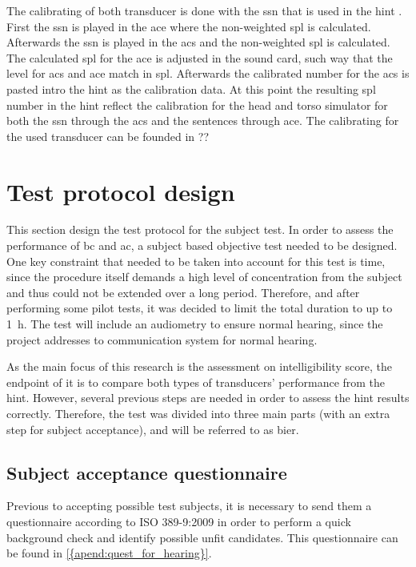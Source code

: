 The calibrating of both transducer is done with the \gls{ssn} that is used in the \gls{hint} \citep{nilsson_95}. First the \gls{ssn} is played in the \gls{ace} where the non-weighted \gls{spl} is calculated. Afterwards the \gls{ssn} is played in the \gls{acs} and the non-weighted \gls{spl} is calculated. The calculated \gls{spl} for the \gls{ace} is adjusted in the sound card, such way that the level for \gls{acs} and \gls{ace} match in \gls{spl}. Afterwards the calibrated number for the \gls{acs} is pasted intro the \gls{hint} as the calibration data. At this point the resulting \gls{spl} number in the \gls{hint} reflect the calibration for the head and torso simulator for both the \gls{ssn} through the \gls{acs} and the sentences through \gls{ace}. The calibrating for the used transducer can be founded in ?? %
   
   
   
\section{Test protocol design}   
This section design the test protocol for the subject test. In order to assess the performance of \gls{bc} and \gls{ac}, a subject based objective test needed to be designed. One key constraint that needed to be taken into account for this test is time, since the procedure itself demands a high level of concentration from the subject and thus could not be extended over a long period. Therefore, and after performing some pilot tests, it was decided to limit the total duration to up to \SI{1}{\hour}. The test will include an audiometry to ensure normal hearing, since the project addresses to communication system for normal hearing.
 
As the main focus of this research is the assessment on intelligibility score, the endpoint of it is to compare both types of transducers' performance from the \gls{hint}. However, several previous steps are needed in order to assess the \gls{hint} results correctly. Therefore, the test was divided into three main parts (with an extra step for subject acceptance), and will be referred to as \gls{bier}. 
 
 \subsection{Subject acceptance questionnaire}
Previous to accepting possible test subjects, it is necessary to send them a questionnaire according to ISO 389-9:2009 \citep{iso_389-9} in order to perform a quick background check and identify possible unfit candidates. This questionnaire can be found in \autoref{{apend:quest_for_hearing}}.
  
